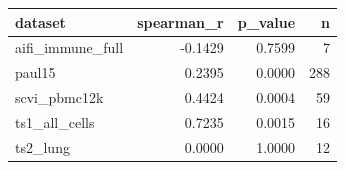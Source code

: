 \begin{tabular}{lrrr}
\toprule
dataset & spearman\_r & p\_value & n \\
\midrule
aifi\_immune\_full & -0.1429 & 0.7599 & 7 \\
paul15 & 0.2395 & 0.0000 & 288 \\
scvi\_pbmc12k & 0.4424 & 0.0004 & 59 \\
ts1\_all\_cells & 0.7235 & 0.0015 & 16 \\
ts2\_lung & 0.0000 & 1.0000 & 12 \\
\bottomrule
\end{tabular}
